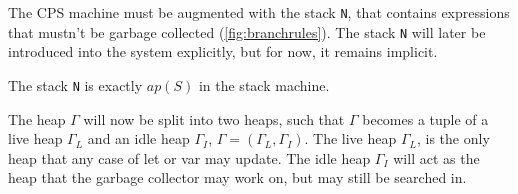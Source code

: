 The CPS machine must be augmented with the stack \texttt{N}, that contains expressions that mustn't be garbage collected (\autoref{fig:branchrules}).
The stack \texttt{N} will later be introduced into the system explicitly, but for now, it remains implicit.
\begin{remark}
  The stack \texttt{N} is exactly $\textit{ap}(S)$ in the stack machine.
\end{remark}

The heap $\Gamma$ will now be split into two heaps, such that $\Gamma$ becomes a tuple of a live heap $\Gamma_L$ and an idle heap $\Gamma_I$, $\Gamma = (\Gamma_L, \Gamma_I)$.
The live heap $\Gamma_L$, is the only heap that any case of let or var may update. 
The idle heap $\Gamma_I$ will act as the heap that the garbage collector may work on, but may still be searched in.

